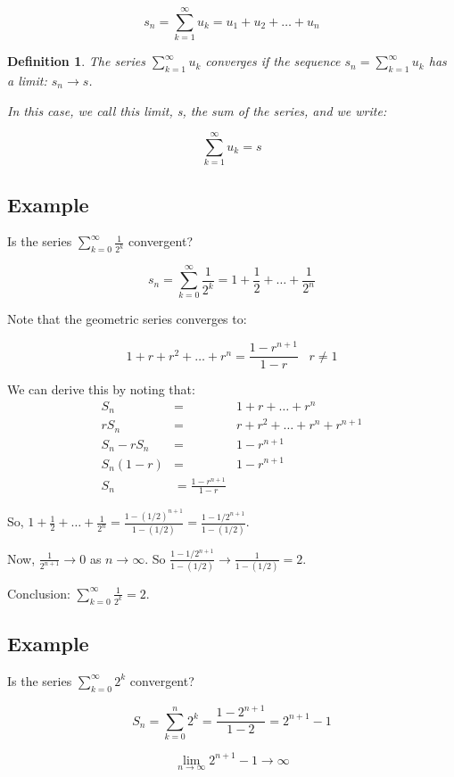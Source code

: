 \documentclass[12pt]{scrbook}
\newtheorem*{definition}{Definition}
\begin{document}
\[ s_n = \sum_{k=1}^{\infty} u_k = u_1 + u_2 + \ldots + u_n \]

\begin{definition}
The series $\sum_{k=1}^{\infty} u_k$ converges if the sequence $s_n = \sum_{k=1}^{\infty} u_k$ has a limit: 
$s_n \rightarrow s$.

In this case, we call this limit, s, the sum of the series, and we write:

\[  \sum_{k=1}^{\infty} u_k = s \]
\end{definition}

\subsection{Example}
Is the series $\sum_{k=0}^{\infty} \frac{1}{2^k} $
convergent?

\[ s_n = \sum_{k=0}^{\infty} \frac{1}{2^k} = 1 + \frac{1}{2} + \ldots
+ \frac{1}{2^n}  \]

Note that the geometric series converges to:

\[ 1 + r + r^2 + \ldots + r^n = \frac{1 - r^{n+1}}{1 - r} \;\;\; r
\neq 1 \]

We can derive this by noting that:
\begin{eqnarray*}
S_n           &=& 1 + r + \ldots + r^n \\
rS_n          &=& r + r^2 + \ldots + r^n  + r^{n+1} \\
S_n - rS_n &=& 1 - r^{n+1} \\
S_n(1-r)    &=& 1-r^{n+1} \\
S_n           &= \frac{1 - r^{n+1}}{1 - r} 
\end{eqnarray*}

So, $ 1 + \frac{1}{2} + \ldots + \frac{1}{2^n} = \frac{1 -
  (1/2)^{n+1}}{1 - (1/2)} = \frac{1 - 1/2^{n+1}}{1-(1/2)} $.  

Now,
$\frac{1}{2^{n+1}} \rightarrow 0$ as $n \rightarrow \infty$.  So $
\frac{1 - 1/2^{n+1}}{1-(1/2)} \rightarrow \frac{1}{1-(1/2)} = 2$.

Conclusion: $\sum_{k=0}^{\infty} \frac{1}{2^k}  = 2$.

\subsection{Example}
Is the series $\sum_{k=0}^{\infty} {2^k} $ convergent?

\[ S_n = \sum_{k=0}^{n} {2^k} = \frac{1-2^{n+1}}{1-2} = 2^{n+1} -1 \]

\[ \lim_{n \to \infty} 2^{n+1} - 1 \rightarrow \infty \]
\end{document}

